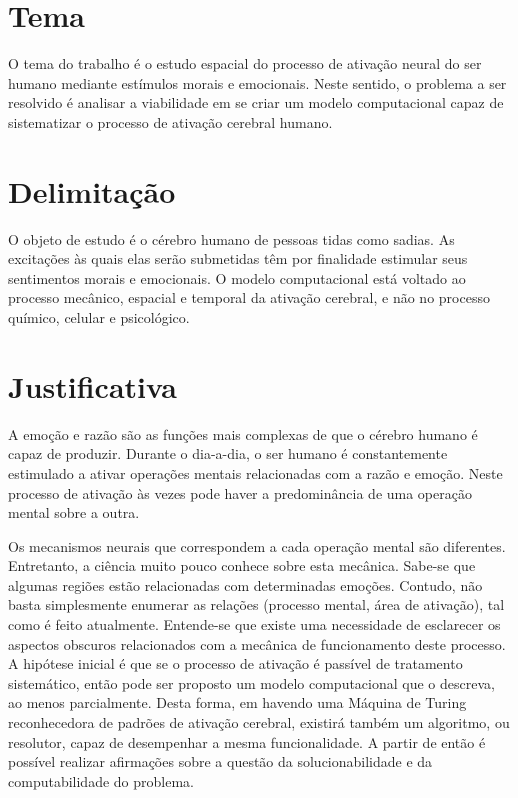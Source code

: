 \documentclass[paper=a4, fontsize=11pt]{scrartcl}
\numberwithin{equation}{section}		%
\numberwithin{figure}{section}			%
\numberwithin{table}{section}				%
\begin{document}
\section{Tema}

O tema do trabalho é o estudo espacial do processo de ativação neural do ser humano mediante estímulos morais e emocionais. Neste sentido, o problema a ser resolvido é analisar a viabilidade em se criar um modelo computacional capaz de sistematizar o processo de ativação cerebral humano. 

\section{Delimitação}

O objeto de estudo é o cérebro humano de pessoas tidas como sadias. As excitações às quais elas serão submetidas têm por finalidade estimular seus sentimentos morais e emocionais. O modelo computacional está voltado ao processo mecânico, espacial e temporal da ativação cerebral, e não no processo químico, celular e psicológico.

\section{Justificativa}

A emoção e razão são as funções mais complexas de que o cérebro humano é capaz de produzir. Durante o dia-a-dia, o ser humano é constantemente estimulado a ativar operações mentais relacionadas com a razão e emoção. Neste processo de ativação às vezes pode haver a predominância de uma operação mental sobre a outra.

Os mecanismos neurais que correspondem a cada operação mental são diferentes. Entretanto, a ciência muito pouco conhece sobre esta mecânica. Sabe-se que algumas regiões estão relacionadas com determinadas emoções. Contudo, não basta simplesmente enumerar as relações (processo mental, área de ativação), tal como é feito atualmente. Entende-se que existe uma necessidade de esclarecer os aspectos obscuros relacionados com a mecânica de funcionamento deste processo. A hipótese inicial é que se o processo de ativação é passível de tratamento sistemático, então pode ser proposto um modelo computacional que o descreva, ao menos parcialmente. Desta forma, em havendo uma Máquina de Turing reconhecedora de padrões de ativação cerebral, existirá também um algoritmo, ou resolutor, capaz de desempenhar a mesma funcionalidade. A partir de então é possível realizar afirmações sobre a questão da solucionabilidade e da computabilidade do problema. 
\end{document}
